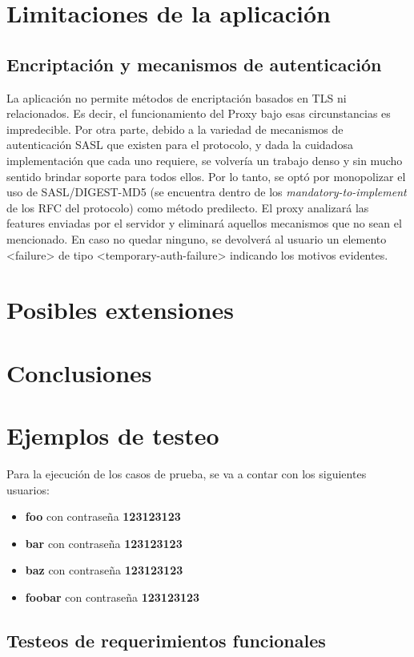\documentclass[a4paper,10pt]{article}
\begin{document}
\section{Limitaciones de la aplicación}
\subsection{Encriptación y mecanismos de autenticación}
La aplicación no permite métodos de encriptación basados en TLS ni  relacionados.
Es decir, el funcionamiento del Proxy bajo esas circunstancias es impredecible.
Por otra parte, debido a la variedad de mecanismos de autenticación SASL que
existen para el protocolo, y dada la cuidadosa implementación que cada uno
requiere, se volvería un trabajo denso y sin mucho sentido brindar soporte para
todos ellos. Por lo tanto, se optó por monopolizar el uso de SASL/DIGEST-MD5
(se encuentra dentro de los \textit{mandatory-to-implement} de los RFC del
protocolo) como método predilecto.
El proxy analizará las features enviadas por el servidor y eliminará
aquellos mecanismos que no sean el mencionado. En caso no quedar ninguno, se
devolverá al usuario un elemento <failure> de tipo <temporary-auth-failure>
indicando los motivos evidentes.


\section{Posibles extensiones}

\section{Conclusiones}

\section{Ejemplos de testeo}
Para la ejecución de los casos de prueba, se va a contar con los siguientes usuarios:
\begin{itemize}
 \item \textbf{foo} con contraseña \textbf{123123123}
 \item \textbf{bar} con contraseña \textbf{123123123}
 \item \textbf{baz} con contraseña \textbf{123123123}
 \item \textbf{foobar} con contraseña \textbf{123123123}
\end{itemize}

\subsection{Testeos de requerimientos funcionales}
\end{document}
